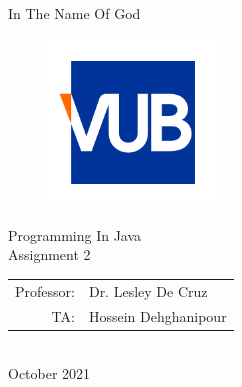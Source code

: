\documentclass[12pt , a4paper]{article}
\begin{document}
%
%
\thispagestyle{empty}
 \begin{center}

{
\centering
{}  
\fontsize{20pt}{20pt}
\selectfont 
In The Name Of God
}
\\[60pt]
\begin{figure}[H]
\centering
\includegraphics[width=0.4\textwidth]{VUB_Logo.jpg}
\caption*{}
\label{f-0-0}
\end{figure}
{
\centering
{}  
\fontsize{18pt}{18pt}
\selectfont 
Programming In Java
}
\\[20pt]
{
\centering
{}  
\fontsize{16pt}{16pt}
\selectfont 
Assignment 2
}
\\[20pt]
{
\centering
{}  
\fontsize{12pt}{12pt}
\selectfont 
\begin{tabular}{r l}
Professor:			&	Dr. Lesley De Cruz\\[5pt]
TA:				&	Hossein Dehghanipour\\[5pt]

\end{tabular}
}
\\[20pt]
{
\centering
{}  
\fontsize{12pt}{12pt}
\selectfont 
October 2021
}

\end{center}
 

 
\setmainfont{Times New Roman}
\newpage

%
%
\tableofcontents
\newpage

%
%
\end{document}
